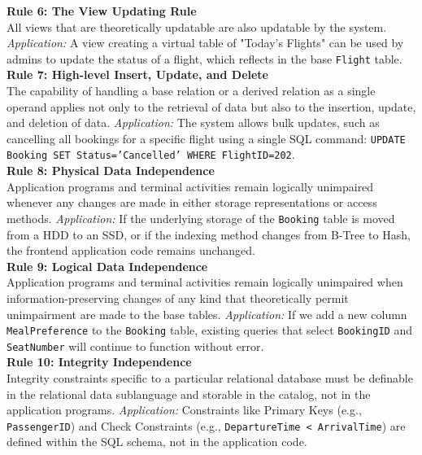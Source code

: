 \documentclass[12pt, a4paper]{article}
\begin{document}
	\textbf{Rule 6: The View Updating Rule} \\
	All views that are theoretically updatable are also updatable by the system.
	\textit{Application:} A view creating a virtual table of "Today's Flights" can be used by admins to update the status of a flight, which reflects in the base \texttt{Flight} table.\\
	
	\textbf{Rule 7: High-level Insert, Update, and Delete} \\
	The capability of handling a base relation or a derived relation as a single operand applies not only to the retrieval of data but also to the insertion, update, and deletion of data.
	\textit{Application:} The system allows bulk updates, such as cancelling all bookings for a specific flight using a single SQL command: \texttt{UPDATE Booking SET Status='Cancelled' WHERE FlightID=202}.\\
	
	\textbf{Rule 8: Physical Data Independence} \\
	Application programs and terminal activities remain logically unimpaired whenever any changes are made in either storage representations or access methods.
	\textit{Application:} If the underlying storage of the \texttt{Booking} table is moved from a HDD to an SSD, or if the indexing method changes from B-Tree to Hash, the frontend application code remains unchanged.\\
	
	\textbf{Rule 9: Logical Data Independence} \\
	Application programs and terminal activities remain logically unimpaired when information-preserving changes of any kind that theoretically permit unimpairment are made to the base tables.
	\textit{Application:} If we add a new column \texttt{MealPreference} to the \texttt{Booking} table, existing queries that select \texttt{BookingID} and \texttt{SeatNumber} will continue to function without error.\\
	
	\textbf{Rule 10: Integrity Independence} \\
	Integrity constraints specific to a particular relational database must be definable in the relational data sublanguage and storable in the catalog, not in the application programs.
	\textit{Application:} Constraints like Primary Keys (e.g., \texttt{PassengerID}) and Check Constraints (e.g., \texttt{DepartureTime < ArrivalTime}) are defined within the SQL schema, not in the application code.\\
	
\end{document}
